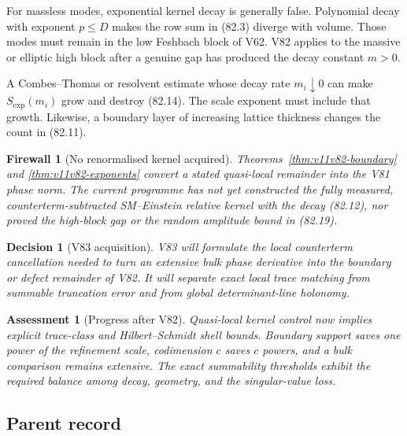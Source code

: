 \documentclass[11pt]{article}
\newtheorem{assessment}[theorem]{Assessment}
\newtheorem{firewall}[theorem]{Firewall}
\newtheorem{decision}[theorem]{Decision}
\begin{document}
For massless modes, exponential kernel decay is generally false.
Polynomial decay with exponent \(p\le D\) makes the row sum in (82.3)
diverge with volume.  Those modes must remain in the low Feshbach
block of V62.  V82 applies to the massive or elliptic high block after
a genuine gap has produced the decay constant \(m>0\).

\begin{warning}
\label{warn:v11v82-uniform}
A Combes--Thomas or resolvent estimate whose decay rate
\(m_i\downarrow0\) can make \(S_{\exp}(m_i)\) grow and destroy
(82.14).  The scale exponent must include that growth.  Likewise,
a boundary layer of increasing lattice thickness changes the count
in (82.11).
\end{warning}

\begin{firewall}[No renormalised kernel acquired]
\label{fire:v11v82-boundary}
Theorems~\ref{thm:v11v82-boundary} and
\ref{thm:v11v82-exponents} convert a stated quasi-local remainder into
the V81 phase norm.  The current programme has not yet constructed
the fully measured, counterterm-subtracted SM--Einstein relative
kernel with the decay (82.12), nor proved the high-block gap or the
random amplitude bound in (82.19).
\end{firewall}

\begin{decision}[V83 acquisition]
\label{dec:v11v82-next}
V83 will formulate the local counterterm cancellation needed to turn
an extensive bulk phase derivative into the boundary or defect
remainder of V82.  It will separate exact local trace matching from
summable truncation error and from global determinant-line holonomy.
\end{decision}

\begin{assessment}[Progress after V82]
\label{ass:v11v82-status}
Quasi-local kernel control now implies explicit trace-class and
Hilbert--Schmidt shell bounds.  Boundary support saves one power of
the refinement scale, codimension \(c\) saves \(c\) powers, and a
bulk comparison remains extensive.  The exact summability thresholds
exhibit the required balance among decay, geometry, and the
singular-value loss.
\end{assessment}

\subsection{Parent record}
\end{document}
